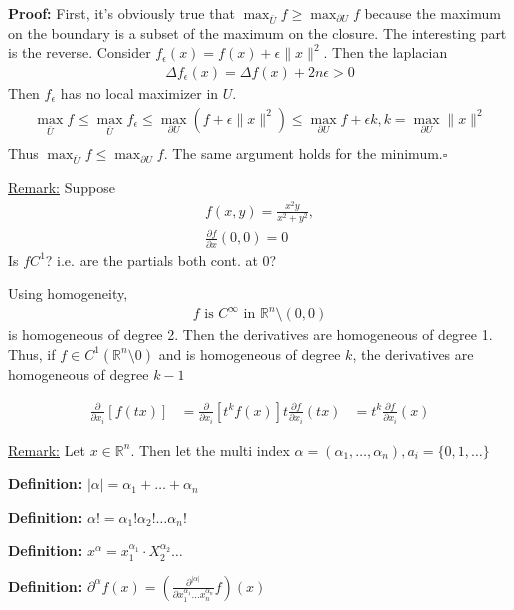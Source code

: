 \documentclass{article}
\newcommand*{\qed}{\hfill$\square$}%
\newcommand*{\txt}[1]{\text{ #1 }}%
\newcommand*{\rr}{\mathbb{R}}%
\begin{document}
\textbf{Proof:} First, it's obviously true that $\max_{\bar{U}}f\geq \max_{\partial U}f$ because the maximum on the boundary is a subset of the maximum on the closure. The interesting part is the reverse. Consider $f_\epsilon(x)=f(x)+\epsilon\|x\|^2$. Then the laplacian \begin{align*}
    \Delta f_\epsilon(x)=\Delta f(x)+2n\epsilon>0
\end{align*} Then $f_\epsilon$ has no local maximizer in $U$. \begin{align*}
    \max_{\bar{U}}f\leq \max_{\bar{U}}f_\epsilon\leq \max_{\partial U}(f+\epsilon\|x\|^2)\leq \max_{\partial U}f+\epsilon k, k=\max_{\partial U}\|x\|^2\\
\end{align*} Thus $\max_{\bar{U}}f\leq \max_{\partial U}f$. The same argument holds for the minimum.\qed

\underline{Remark:} Suppose \begin{align*}
    f(x,y)=\frac{x^2y}{x^2+y^2},\\
    \frac{\partial f}{\partial x}(0,0)=0
\end{align*} Is $f C^1$? i.e. are the partials both cont. at 0?

Using homogeneity, \begin{align*}
    f\txt{is}C^{\infty}\txt{in}\rr^n\setminus{(0,0)}
\end{align*} is homogeneous of degree 2. Then the derivatives are homogeneous of degree 1. Thus, if $f\in C^1(\rr^n\setminus{0})$ and is homogeneous of degree $k$, the derivatives are homogeneous of degree $k-1$

\begin{align*}
    \frac{\partial}{\partial x_i}[f(tx)]&=\frac{\partial}{\partial x_i}[t^kf(x)]
    t \frac{\partial f}{\partial x_i}(tx)&=t^k\frac{\partial f}{\partial x_i}(x)
\end{align*} 

\underline{Remark:} Let $x\in \rr^n$. Then let the multi index $\alpha=(\alpha_1,\dots,\alpha_n), a_i=\{0,1,\dots\}$

\textbf{Definition:} $|\alpha|=\alpha_1+\dots+\alpha_n$

\textbf{Definition:} $\alpha!=\alpha_1!\alpha_2!\dots\alpha_n!$

\textbf{Definition:} $x^\alpha=x_1^{\alpha_1}\cdot X_2^{\alpha_2}\dots$

\textbf{Definition:} $\partial^\alpha f(x)=(\frac{\partial^{|\alpha|}}{\partial x_1^{\alpha_1}\dots x_n^{\alpha_n}}f)(x)$
\end{document}
